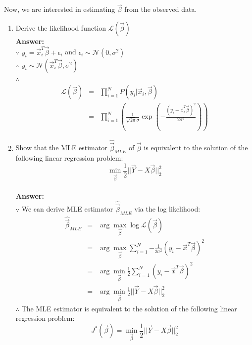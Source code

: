 \documentclass{article}
\begin{document}
Now, we are interested in estimating $\vec{\beta}$ from the observed data.
\begin{enumerate}
	\item Derive the likelihood function $\mathcal{L}(\vec{\beta})$
	\\\textbf{Answer:}\\
	$\because$ $y_i=\vec{x}_i^T \vec{\beta} + \epsilon_i$ and $\epsilon_i \sim \mathcal{N}(0,\sigma^2)$\\
	$\therefore$ $y_i \sim \mathcal{N}(\vec{x}_i^T\vec{\beta},\sigma^2)$\\
	$\therefore$ 
	\begin{equation}
	\nonumber
	\begin{array}{rcl}
	\mathcal{L}(\vec{\beta}) & = & \prod_{i=1}^{N}P(y_i|\vec{x}_i,\vec{\beta}) \\
							 & = & \prod_{i=1}^{N}(\frac{1}{\sqrt{2\pi}\sigma}\exp(-\frac{(y_i-\vec{x}_i^T\vec{\beta})^2}{2\sigma^2}))
	\end{array}
	\end{equation}
	
	\item Show that the MLE estimator $\hat{\vec{\beta}}_{MLE}$ of $\vec{\beta}$ is equivalent to the solution of the following linear regression problem:
	\begin{equation}
	\label{eq:MLE}
	\min_{\vec{\beta}}\frac{1}{2}||\vec{Y}-X\vec{\beta}||_2^2
	\end{equation}
	\\\textbf{Answer:}\\
	$\because$ We can derive MLE estimator $\hat{\vec{\beta}}_{MLE}$ via the log likelihood:
	\begin{equation}
	\nonumber
	\begin{array}{rcl}
	\hat{\vec{\beta}}_{MLE} & = & \arg\max_{\vec{\beta}} \log{\mathcal{L}(\vec{\beta})} \\
							& = & \arg\max_{\vec{\beta}} \sum_{i=1}^{N}{-\frac{1}{2\sigma^2}(y_i-\vec{x}^T\vec{\beta})^2} \\
							& = & \arg\min_{\vec{\beta}} \frac{1}{2}\sum_{i=1}^{N}{(y_i-\vec{x}^T\vec{\beta})^2} \\
							& = & \arg\min_{\vec{\beta}} \frac{1}{2}||\vec{Y}-X\vec{\beta}||_2^2
	\end{array}
	\end{equation}
	$\therefore$ The MLE estimator is equivalent to the solution of the following linear regression problem: $$J^*(\vec{\beta})=\min_{\vec{\beta}}\frac{1}{2}||\vec{Y}-X\vec{\beta}||_2^2$$
	

\end{enumerate}
\end{document}
